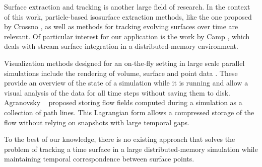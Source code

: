 %
Surface extraction and tracking is another large field of research.
%
In the context of this work, particle-based isosurface extraction methods, like
the one proposed by Crossno \etal \cite{Crossno1997}, as well as methods for
tracking evolving surfaces over time \cite{Krishnan2009,Buerger2009,Berres2015}
are relevant.
%
Of particular interest for our application is the work by Camp \etal
\cite{Camp2012}, which deals with stream surface integration in a
distributed-memory environment.
%

%
Visualization methods designed for an on-the-fly setting in large scale parallel
simulations include the rendering of volume, surface and point data
\cite{Akiba2007,Yu2010}.
%
These provide an overview of the state of a simulation while it is running and
allow a visual analysis of the data for all time steps without saving them to
disk.
%
Agranovsky \etal~\cite{Agranovsky2014} proposed storing flow fields computed
during a simulation as a collection of path lines.
%
This Lagrangian form allows a compressed storage of the flow without relying on
snapshots with large temporal gaps.
%

%
To the best of our knowledge, there is no existing approach that solves the
problem of tracking a time surface in a large distributed-memory simulation
while maintaining temporal correspondence between surface points.
%
